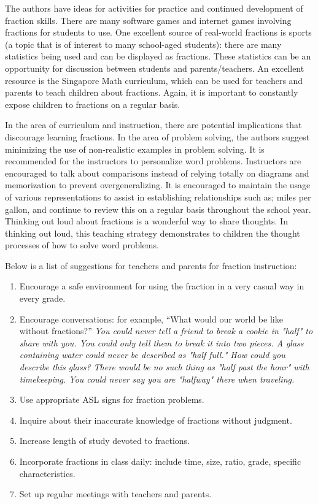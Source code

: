 \documentclass[11.5pt]{sig-alternate} %
\begin{document}
\begin{large}
The authors have ideas for activities for practice and continued development of fraction skills. There are many software games and internet games involving fractions for students to use. One excellent source of real-world fractions is sports (a topic that is of interest to many school-aged students): there are many statistics being used and can be displayed as fractions. These statistics can be an opportunity for discussion between students and parents/teachers. An excellent resource is the Singapore Math curriculum, which can be used for teachers and parents to teach children about fractions. Again, it is important to constantly expose children to fractions on a regular basis. 

In the area of curriculum and instruction, there are potential implications that discourage learning fractions. In the area of problem solving, the authors suggest minimizing the use of non-realistic examples in problem solving. It is recommended for the instructors to personalize word problems. Instructors are encouraged to talk about comparisons instead of relying totally on diagrams and memorization to prevent overgeneralizing. It is encouraged to maintain the usage of various representations to assist in establishing relationships such as; miles per gallon, and continue to review this on a regular basis throughout the school year. Thinking out loud about fractions is a wonderful way to share thoughts. In thinking out loud, this teaching strategy demonstrates to children the thought processes of how to solve word problems. 

Below is a list of suggestions for teachers and parents for fraction instruction: 

\begin{enumerate}
    \item Encourage a safe environment for using the fraction in a very casual way in every grade.
    \item Encourage conversations: for example, “What would our world be like without fractions?” \textit{You could never tell a friend to break a cookie in "half" to share with you. You could only tell them to break it into two pieces. A glass containing water could never be described as "half full." How could you describe this glass? There would be no such thing as "half past the hour" with timekeeping. You could never say you are "halfway" there when traveling.}
    \item Use appropriate ASL signs for fraction problems.
    \item Inquire about their inaccurate knowledge of fractions without judgment.
    \item Increase length of study devoted to fractions.
    \item Incorporate fractions in class daily: include time, size, ratio, grade, specific characteristics.
    \item Set up regular meetings with teachers and parents.
\end{enumerate}


\end{large}
\end{document}
